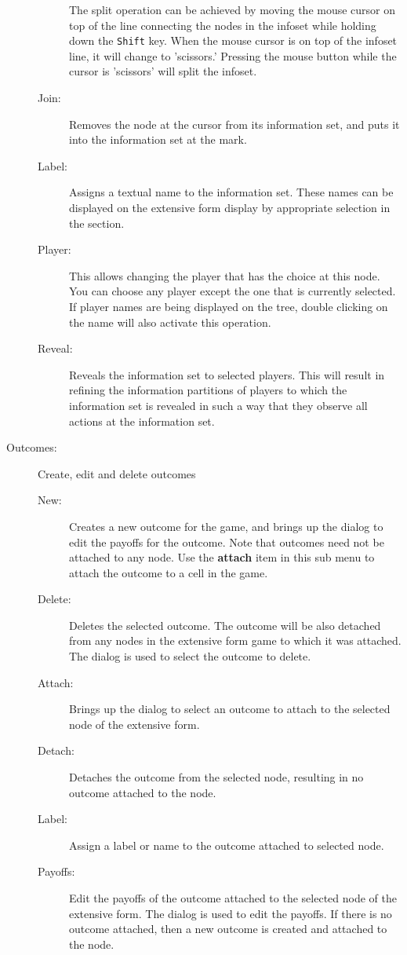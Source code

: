 \begin{description}
\begin{description}
 The split operation can be
achieved by moving the mouse cursor on top of the line connecting the
nodes in the infoset while holding down the {\tt Shift} key.  When the
mouse cursor is on top of the infoset line, it will change to
'scissors.'  Pressing the mouse button while the cursor is 'scissors'
will split the infoset.
\item[Join:] Removes the node at the cursor from its information set,
and puts it into the information set at the mark.
\item[Label:] Assigns a textual name to the information set.  These
names can be displayed on the extensive form display by appropriate
selection in the \helpref{}{} section. 
\item[Player:] This allows changing the player that has the choice at
this node.  You can choose any player except the one that is currently
selected.  If player names are being displayed on the tree, double
clicking on the name will also activate this operation.
\item[Reveal:] Reveals the information set to selected players.  This
will result in refining the information partitions of players to which
the information set is revealed in such a way that they observe all
actions at the information set.
\end{description}

\item[Outcomes:] Create, edit and delete outcomes
\begin{description}
\item[New:] Creates a new outcome for the game, and brings up the 
 dialog to edit the payoffs for
the outcome.  Note that outcomes need not be attached to any node.
Use the {\bf attach} item in this sub menu to attach the outcome to a
cell in the game. 
\item[Delete:] Deletes the selected outcome.  The outcome will be also
detached from any nodes in the extensive form game to which it was
attached. The  dialog is used
to select the outcome to delete.
\item[Attach:] Brings up the  
dialog to select an outcome to attach to the selected node of the
extensive form.
\item[Detach:] Detaches the outcome from the selected node, resulting
in no outcome attached to the node.
\item[Label:] Assign a label or name to the outcome attached to
selected node.
\item[Payoffs:] Edit the payoffs of the outcome attached to the
selected node of the extensive form. The  dialog is used to edit the payoffs. If there is
no outcome attached, then a new outcome is created and attached to the
node.
\end{description}


\end{description}
